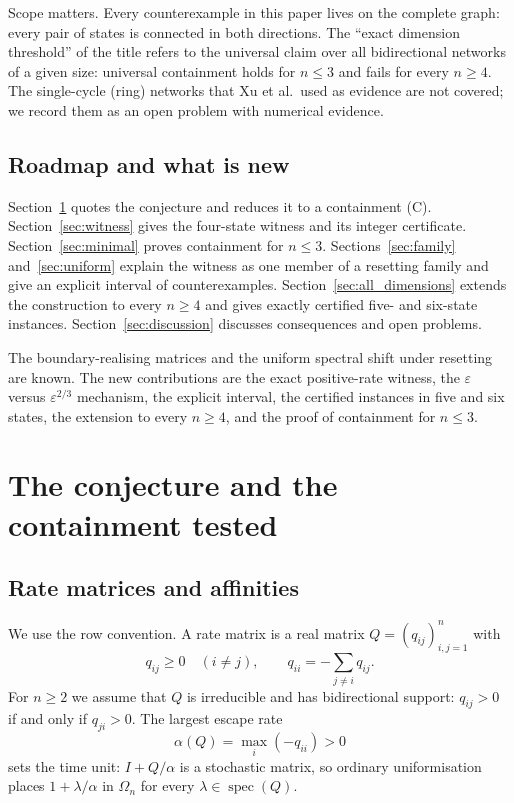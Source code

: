 \documentclass[11pt,a4paper]{article}
\numberwithin{equation}{section}
\theoremstyle{definition}
\theoremstyle{remark}
\newcommand{\spec}{\operatorname{spec}}
\newcommand{\Om}{\Omega}
\newcommand{\eps}{\varepsilon}
\begin{document}
Scope matters. Every counterexample in this paper lives on the complete
graph: every pair of states is connected in both directions. The
``exact dimension threshold'' of the title refers to the universal
claim over all bidirectional networks of a given size: universal
containment holds for \(n\le3\) and fails for every \(n\ge4\). The
single-cycle (ring) networks that Xu et al.\ used as evidence are not
covered; we record them as an open problem with numerical evidence.

\subsection{Roadmap and what is new}

Section~\ref{sec:setup} quotes the conjecture and reduces it to a
containment (C). Section~\ref{sec:witness} gives the four-state witness
and its integer certificate. Section~\ref{sec:minimal} proves
containment for \(n\le3\). Sections~\ref{sec:family}
and~\ref{sec:uniform} explain the witness as one member of a resetting
family and give an explicit interval of counterexamples.
Section~\ref{sec:all_dimensions} extends the construction to every
\(n\ge4\) and gives exactly certified five- and six-state instances.
Section~\ref{sec:discussion} discusses consequences and open problems.

The boundary-realising matrices \cite{johnson2017,kirkland2022} and the
uniform spectral shift under resetting \cite{rose2018} are known. The
new contributions are the exact positive-rate witness, the
\(\eps\) versus \(\eps^{2/3}\) mechanism, the explicit interval, the
certified instances in five and six states, the extension to every
\(n\ge4\), and the proof of containment for \(n\le3\).

\section{The conjecture and the containment tested}
\label{sec:setup}

\subsection{Rate matrices and affinities}

We use the row convention. A rate matrix is a real matrix
\(Q=(q_{ij})_{i,j=1}^{n}\) with
\begin{equation}
q_{ij}\geq0\quad(i\ne j),\qquad
q_{ii}=-\sum_{j\ne i}q_{ij}.
\label{eq:generator}
\end{equation}
For \(n\geq2\) we assume that \(Q\) is irreducible and has bidirectional
support: \(q_{ij}>0\) if and only if \(q_{ji}>0\). The largest escape
rate
\begin{equation}
\alpha(Q)=\max_i(-q_{ii})>0
\end{equation}
sets the time unit: \(I+Q/\alpha\) is a stochastic matrix, so ordinary
uniformisation places \(1+\lambda/\alpha\) in \(\Om_n\) for every
\(\lambda\in\spec(Q)\).
\end{document}
